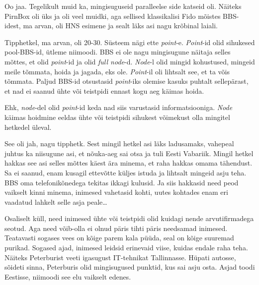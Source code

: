                 
Oo jaa. Tegelikult muid ka, mingisuguseid paralleelse side katseid oli. Näiteks PirnBox oli üks ja oli veel muidki, aga sellised klassikalisi Fido  mõistes BBS-idest, ma arvan, oli HNS esimene ja sealt läks asi nagu krõbinal laiali.
                 
                 
Tipphetkel, ma arvan, oli 20-30. Süsteem nägi ette \emph{point}-e. \emph{Point}-id olid sihukesed pool-BBS-id, ütleme niimoodi. BBS ei ole nagu mingisugune näitaja selles mõttes, et olid \emph{point}-id ja olid \emph{full node}-d. \emph{Node}-l olid mingid kohustused, mingeid meile tõmmata, hoida ja jagada, eks ole. \emph{Point}-il oli lihtsalt see, et ta võis tõmmata. Paljud BBS-id otsustasid \emph{point}-iks  olemise kasuks puhtalt sellepärast, et nad ei saanud ühte või teistpidi ennast kogu aeg käimas hoida.
                 
Ehk, \emph{node}-del olid \emph{point}-id keda nad siis varustasid informatsiooniga. \emph{Node} käimas hoidmine eeldas ühte või teistpidi sihukest võimekust olla  mingitel hetkedel üleval.
                 

See oli jah, nagu tipphetk. Sest mingil hetkel asi läks ladusamaks, vahepeal juhtus ka niisugune asi, et  nõuka-aeg sai otsa ja tuli Eesti Vabariik. Mingil hetkel hakkas see asi selles mõttes käest ära minema, et raha hakkas omama tähendust. Sa ei saanud, enam kusagil ettevõtte küljes istuda ja lihtsalt mingeid asju teha. BBS oma telefonikõnedega tekitas ikkagi kulusid. Ja siis hakkasid need peod vaikselt kinni minema, inimesed vahetasid kohti, uutes kohtades enam eri vaadatud lahkelt selle asja peale\ldots


Osaliselt küll, need inimesed ühte või teistpidi olid kuidagi nende arvutifirmadega seotud. Aga need võib-olla ei olnud päris tihti päris needsamad inimesed. Teatavasti sogases vees on kõige parem kala püüda, seal on kõige suuremad purikad. Sogased ajad, inimesed leidsid erinevaid viise, kuidas endale raha teha. Näiteks Peterburist veeti igasugust IT-tehnikat Tallinnasse. Hüpati autosse, sõideti sinna, Peterburis olid mingisugused punktid, kus sai asju osta. Asjad toodi Eestisse, niimoodi see elu vaikselt edenes.
                 
